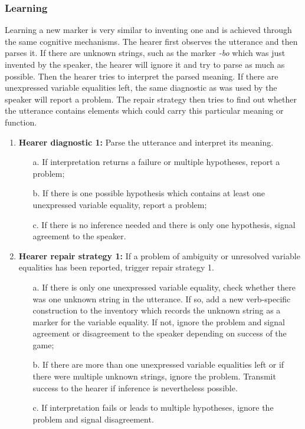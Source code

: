 \subsubsection{Learning}
 Learning a new marker is very similar to inventing one and is achieved through the same cognitive mechanisms. The hearer first observes the utterance and then parses it. If there are unknown strings, such as the marker {\em -bo} which was just invented by the speaker, the hearer will ignore it and try to parse as much as possible. Then the hearer tries to interpret the parsed meaning. If there are unexpressed variable equalities left, the same diagnostic as was used by the speaker will report a problem. The repair strategy then tries to find out whether the utterance contains elements which could carry this particular meaning or function.

\begin{enumerate}
\item {\bfseries Hearer diagnostic 1:} Parse the utterance and interpret its meaning.
\begin{enumerate}
\item[a.] If interpretation returns a failure or multiple hypotheses, report a problem;
\item[b.] If there is one possible hypothesis which contains at least one unexpressed variable equality, report a problem;
\item[c.] If there is no inference needed and there is only one hypothesis, signal agreement to the speaker.
\end{enumerate}
\item {\bfseries Hearer repair strategy 1:} If a problem of ambiguity or unresolved variable equalities has been reported, trigger repair strategy 1.
\begin{enumerate}
\item[a.] If there is only one unexpressed variable equality, check whether there was one unknown string in the utterance. If so, add a new verb-specific construction to the inventory which records the unknown string as a marker for the variable equality. If not, ignore the problem and signal agreement or disagreement to the speaker depending on success of the game;
\item[b.] If there are more than one unexpressed variable equalities left or if there were multiple unknown strings, ignore the problem. Transmit success to the hearer if inference is nevertheless possible. 
\item[c.] If interpretation fails or leads to multiple hypotheses, ignore the problem and signal disagreement.
\end{enumerate}
\end{enumerate}

